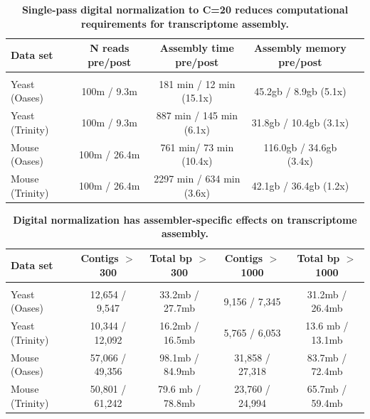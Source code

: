 
\begin{table}[!ht]
\caption{
\bf{Single-pass digital normalization to C=20 reduces computational
requirements for transcriptome assembly.}}


\begin{tabular}{|l|c|c|c|c|}

Data set & N reads pre/post & Assembly time pre/post & Assembly memory pre/post \\
 \hline \\
Yeast (Oases) & 100m / 9.3m & 181 min / 12 min (15.1x) & 45.2gb / 8.9gb (5.1x) \\
Yeast (Trinity) & 100m / 9.3m & 887 min / 145 min (6.1x) & 31.8gb / 10.4gb (3.1x) \\
Mouse (Oases) & 100m / 26.4m & 761 min/ 73 min (10.4x) & 116.0gb / 34.6gb (3.4x) \\
Mouse (Trinity) & 100m / 26.4m & 2297 min / 634 min (3.6x) & 42.1gb / 36.4gb (1.2x) \\
\end{tabular}

\begin{flushleft}
\end{flushleft}
\label{tab:dntrans}
\end{table}


\begin{table}[!ht]
\caption{
\bf{Digital normalization has assembler-specific effects on transcriptome
assembly.}}


\begin{tabular}{|l|c|c|c|c|}

Data set & Contigs $>$ 300 & Total bp $>$ 300 & Contigs $>$ 1000 & Total bp $>$ 1000 \\
\hline \\
Yeast (Oases) & 12,654 / 9,547 & 33.2mb / 27.7mb & 9,156 / 7,345 & 31.2mb / 26.4mb \\
Yeast (Trinity) & 10,344 / 12,092 & 16.2mb / 16.5mb & 5,765 / 6,053 & 13.6 mb / 13.1mb \\
Mouse (Oases) & 57,066 / 49,356 & 98.1mb / 84.9mb & 31,858 / 27,318 & 83.7mb / 72.4mb \\
Mouse (Trinity) & 50,801 / 61,242 & 79.6 mb / 78.8mb & 23,760 / 24,994 & 65.7mb / 59.4mb \\

\end{tabular}

\begin{flushleft}
\end{flushleft}
\label{tab:dntrans0}
\end{table}

